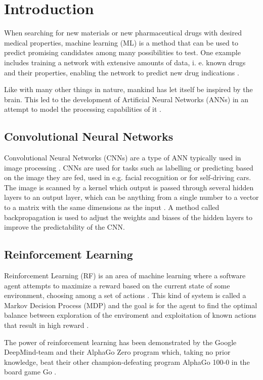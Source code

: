 \chapter{Introduction}

When searching for new materials or new pharmaceutical drugs with desired medical properties, machine learning (ML) is a method that can be used to predict promising candidates among many possibilities to test. One example includes training a network with extensive amounts of data, i. e. known drugs and their properties, enabling the network to predict new drug indications \cite{Dumontier2017}. 

Like with many other things in nature, mankind has let itself be inspired by the brain. This led to the development of Artificial Neural Networks (ANNs) in an attempt to model the processing capabilities of it \cite{Rojas96}. 

\section{Convolutional Neural Networks}

Convolutional Neural Networks (CNNs) are a type of ANN typically used in image processing \cite{WikiCNN}. CNNs are used for tasks such as labelling or predicting based on the image they are fed, used in e.g. facial recognition or for self-driving cars. The image is scanned by a kernel which output is passed through several hidden layers to an output layer, which can be anything from a single number to a vector to a matrix with the same dimensions as the input . A method called backpropagation is used to adjust the weights and biases of the hidden layers to improve the predictability of the CNN. \cite{WikiCNN}

\section{Reinforcement Learning}

Reinforcement Learning (RF) is an area of machine learning where a software agent attempts to maximize a reward based on the current state of some environment, choosing among a set of actions \cite{Wiki_RF}. This kind of system is called a Markov Decision Process (MDP) and the goal is for the agent to find the optimal balance between exploration of the enviroment and exploitation of known actions that result in high reward \cite{Wiki_RF}.

The power of reinforcement learning has been demonstrated by the Google DeepMind-team and their AlphaGo Zero program which, taking no prior knowledge, beat their other champion-defeating program AlphaGo 100-0 in the board game Go \cite{AlphaGo}. \\

